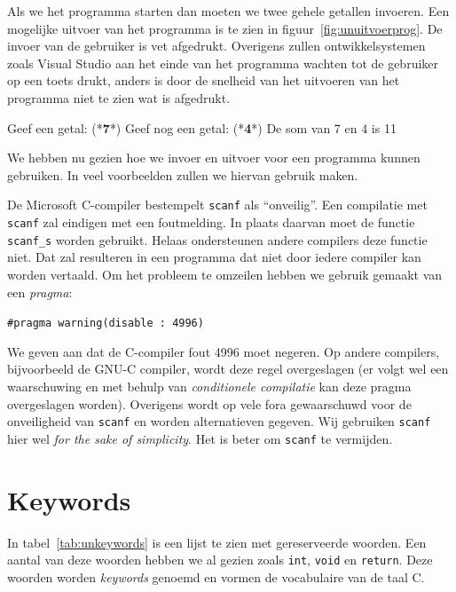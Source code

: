 Als we het programma starten dan moeten we twee gehele getallen invoeren. Een mogelijke uitvoer van het programma is te zien in figuur~\ref{fig:unuitvoerprog}. De invoer van de gebruiker is vet afgedrukt.
Overigens zullen ontwikkelsystemen zoals Visual Studio aan het einde van het programma wachten tot de gebruiker op een toets drukt, anders is door de snelheid van het uitvoeren van het programma niet te zien wat is afgedrukt.

\begin{dosbox}[title=Uitvoer van het programma in listing~\ref{cod:sumoftwo}.,label=fig:unuitvoerprog]
Geef een getal: (*\textbf{7}*)
Geef nog een getal: (*\textbf{4}*)
De som van 7 en 4 is 11
\end{dosbox}

We hebben nu gezien hoe we invoer en uitvoer voor een programma kunnen gebruiken. In veel voorbeelden zullen we hiervan gebruik maken.

\begin{infobox}
\label{fig:unopmerkingscanf}%
De Microsoft C-compiler bestempelt \texttt{scanf} als ``onveilig''. Een compilatie met \texttt{scanf} zal eindigen met een foutmelding. In plaats daarvan moet de functie \texttt{scanf\_s} worden gebruikt. Helaas ondersteunen andere compilers deze functie niet. Dat zal resulteren in een programma dat niet door iedere compiler kan worden vertaald. Om het probleem te omzeilen hebben we gebruik gemaakt van een \textsl{pragma}:

\hspace*{1em}\texttt{\#pragma warning(disable : 4996)}

We geven aan dat de C-compiler fout 4996 moet negeren. Op andere compilers, bijvoorbeeld de GNU-C compiler, wordt deze regel overgeslagen (er volgt wel een waarschuwing en met behulp van \textsl{conditionele compilatie} kan deze pragma overgeslagen worden). Overigens wordt op vele fora gewaarschuwd voor de onveiligheid van \texttt{scanf} en worden alternatieven gegeven. Wij gebruiken \texttt{scanf} hier wel \textsl{for the sake of simplicity}. Het is beter om \texttt{scanf} te vermijden.
\end{infobox}


\section{Keywords}
In tabel~\ref{tab:unkeywords} is een lijst te zien met gereserveerde woorden. Een aantal van deze woorden hebben we al gezien zoals \texttt{int}, \texttt{void} en \texttt{return}. Deze woorden worden \textsl{keywords} genoemd en vormen de vocabulaire van de taal C.

